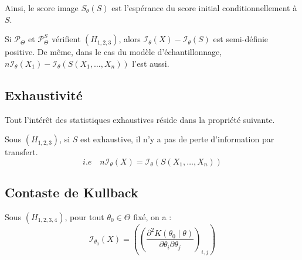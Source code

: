 Ainsi, le score image $S_\theta(S)$ est l'espérance du score initial conditionnellement à $S$. 

\begin{prop}[Décroissance]
    Si $ \mathcal{P}_\Theta$ et $ \mathcal{P}_\Theta^S$ vérifient $(H_{1,2,3})$, alors 
    $ \mathcal{I}_\theta(X) - \mathcal{I}_\theta(S)$ est semi-définie positive. 
    De même, dans le cas du modèle d'échantillonnage,  $ n \mathcal{I}_\theta(X_1) - \mathcal{I}_\theta(S(X_1, \dots, X_n))$
    l'est aussi. 
\end{prop}

\subsection{Exhaustivité}

Tout l'intérêt des statistiques exhaustives réside dans la propriété suivante. 

\begin{proposition}
    Sous $(H_{1, 2, 3})$, si $S$ est exhaustive, il n'y a pas de perte d'information par transfert. 
        $$ i.e \quad n \mathcal{I}_\theta(X) = \mathcal{I}_\theta(S(X_1, \dots, X_n)) $$
\end{proposition}


\subsection{Contaste de Kullback}

\begin{proposition}
    Sous $(H_{1, 2, 3, 4})$, pour tout $ \theta_0 \in \Theta$ fixé, on a : 
        $$ \mathcal{I}_{\theta_0}(X) = \left( \left( \frac{ \partial^2 K( \theta_0 \mid \theta)}{ \partial \theta_i \partial \theta_j} \right)_{i,j}\right) $$
\end{proposition}



